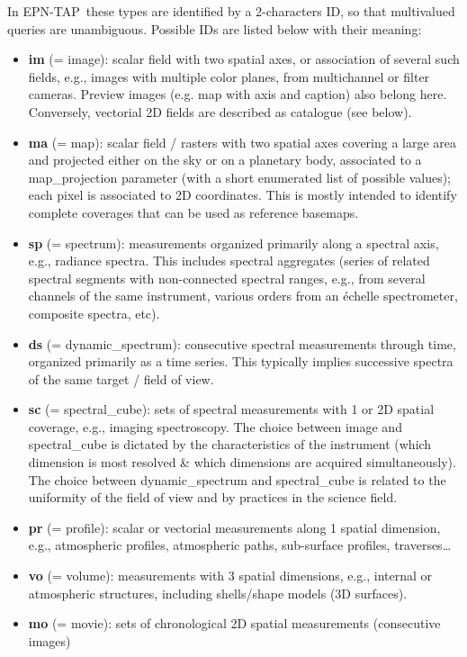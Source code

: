 \documentclass[11pt,a4paper]{ivoa}
\begin{document}
In EPN-TAP these types are identified by a 2-characters ID, so that multivalued queries are unambiguous. Possible IDs are listed below with their meaning:

\begin{itemize}
\item \textbf{im }(= image): scalar field with two spatial axes, or association of several such fields, e.g., images with multiple color planes, from multichannel or filter cameras. Preview images (e.g. map with axis and caption) also belong here. Conversely, vectorial 2D fields are described as catalogue (see below).
\item \textbf{ma }(= map): scalar field / rasters with two spatial axes covering a large area and projected either on the sky or on a planetary body, associated to a map\_projection parameter (with a short enumerated list of possible values); each pixel is associated to 2D coordinates. This is mostly intended to identify complete coverages that can be used as reference basemaps. 
\item \textbf{sp }(= spectrum): measurements organized primarily along a spectral axis, e.g., radiance spectra. This includes spectral aggregates (series of related spectral segments with non-connected spectral ranges, e.g., from several channels of the same instrument, various orders from an échelle spectrometer, composite spectra, etc).
\item \textbf{ds }(= dynamic\_spectrum): consecutive spectral measurements through time, organized primarily as a time series. This typically implies successive spectra of the same target / field of view.
\item \textbf{sc }(= spectral\_cube): sets of spectral measurements with 1 or 2D spatial coverage, e.g., imaging spectroscopy. The choice between image and spectral\_cube is dictated by the characteristics of the instrument (which dimension is most resolved \& which dimensions are acquired simultaneously). The choice between dynamic\_spectrum and spectral\_cube is related to the uniformity of the field of view and by practices in the science field.
\item \textbf{pr }(= profile): scalar or vectorial measurements along 1 spatial dimension, e.g., atmospheric profiles, atmospheric paths, sub-surface profiles, traverses…
\item \textbf{vo }(= volume): measurements with 3 spatial dimensions, e.g., internal or atmospheric structures, including shells/shape models (3D surfaces).
\item \textbf{mo }(= movie): sets of chronological 2D spatial measurements (consecutive images)

\end{itemize}
\end{document}
